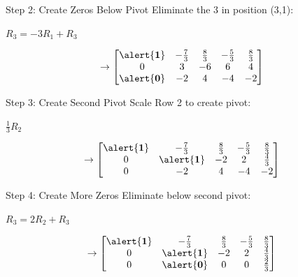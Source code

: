 \documentclass[aspectratio=169,xcolor=dvipsnames,svgnames,x11names,fleqn]{beamer}
\begin{document}
\begin{frame}{Step 2: Create Zeros Below Pivot}
\centering
Eliminate the 3 in position (3,1):

\vspace{3mm}
$R_3 = -3R_1 + R_3$

\vspace{3mm}
$$
\rightarrow \begin{bmatrix}
\alert{\mathbf{1}} & -\frac{7}{3} & \frac{8}{3} & -\frac{5}{3} & \frac{8}{3} \\
0 & 3 & -6 & 6 & 4 \\
\alert{\mathbf{0}} & -2 & 4 & -4 & -2 \\
\end{bmatrix}
$$
\end{frame}

\begin{frame}{Step 3: Create Second Pivot}
\centering
Scale Row 2 to create pivot:

\vspace{3mm}
$\frac{1}{3}R_2$

\vspace{3mm}
$$
\rightarrow \begin{bmatrix}
\alert{\mathbf{1}} & -\frac{7}{3} & \frac{8}{3} & -\frac{5}{3} & \frac{8}{3} \\
0 & \alert{\mathbf{1}} & -2 & 2 & \frac{4}{3} \\
0 & -2 & 4 & -4 & -2 \\
\end{bmatrix}
$$
\end{frame}

\begin{frame}{Step 4: Create More Zeros}
\centering
Eliminate below second pivot:

\vspace{3mm}
$R_3 = 2R_2 + R_3$

\vspace{3mm}
$$
\rightarrow \begin{bmatrix}
\alert{\mathbf{1}} & -\frac{7}{3} & \frac{8}{3} & -\frac{5}{3} & \frac{8}{3} \\
0 & \alert{\mathbf{1}} & -2 & 2 & \frac{4}{3} \\
0 & \alert{\mathbf{0}} & 0 & 0 & \frac{2}{3} \\
\end{bmatrix}
$$
\end{frame}
\end{document}
